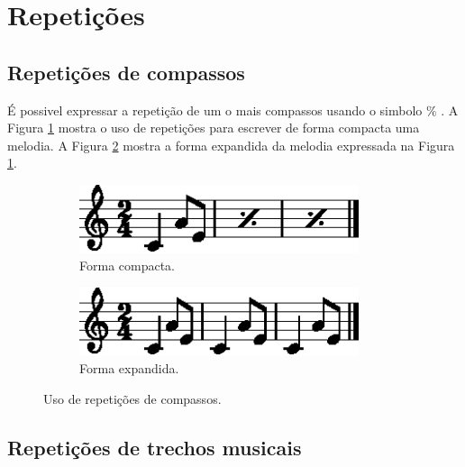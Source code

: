 \section{Repetições}
\label{sec:repetitions}

\subsection{Repetições de compassos}
\label{sec:repetitions:compass}

É possivel expressar a repetição de um o mais compassos usando o simbolo $\%$ 
\cite[pp. 249]{medteoria} \cite[pp. 111]{mascarenhascurso}.
A Figura \ref{fig:repeat-bar1-1} mostra o uso de repetições para escrever de forma compacta uma melodia.
A Figura \ref{fig:repeat-bar2-1} mostra a forma expandida da melodia expressada na Figura \ref{fig:repeat-bar1-1}.
\begin{figure}[!h]
\centering
    \begin{subfigure}[b]{0.6\textwidth}
        \includegraphics[width=0.9\textwidth]{chapters/cap-musica-basica/repeat-bar1-1.eps}
        \caption{Forma compacta.}
        \label{fig:repeat-bar1-1}
    \end{subfigure}
    \begin{subfigure}[b]{0.6\textwidth}
        \includegraphics[width=0.9\textwidth]{chapters/cap-musica-basica/repeat-bar2-1.eps}
        \caption{Forma expandida.}
        \label{fig:repeat-bar2-1}
    \end{subfigure}
\caption{Uso de repetições de compassos.}
\label{fig:repeat-bar1}
\end{figure}


\subsection{Repetições de trechos musicais}
\label{sec:repetitions:manycompass}

